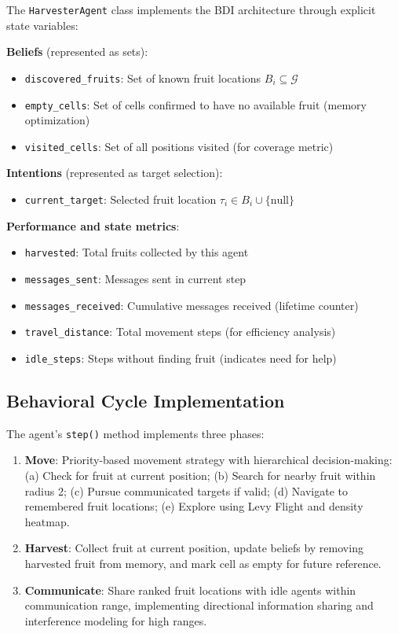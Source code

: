The \texttt{HarvesterAgent} class implements the BDI architecture \citep{bratman1987intention, rao1995bdi} through explicit state variables:

\textbf{Beliefs} (represented as sets):
\begin{itemize}
    \item \texttt{discovered\_fruits}: Set of known fruit locations $B_i \subseteq \mathcal{G}$
    \item \texttt{empty\_cells}: Set of cells confirmed to have no available fruit (memory optimization)
    \item \texttt{visited\_cells}: Set of all positions visited (for coverage metric)
\end{itemize}

\textbf{Intentions} (represented as target selection):
\begin{itemize}
    \item \texttt{current\_target}: Selected fruit location $\tau_i \in B_i \cup \{\text{null}\}$
\end{itemize}

\textbf{Performance and state metrics}:
\begin{itemize}
    \item \texttt{harvested}: Total fruits collected by this agent
    \item \texttt{messages\_sent}: Messages sent in current step
    \item \texttt{messages\_received}: Cumulative messages received (lifetime counter)
    \item \texttt{travel\_distance}: Total movement steps (for efficiency analysis)
    \item \texttt{idle\_steps}: Steps without finding fruit (indicates need for help)
\end{itemize}

\subsection{Behavioral Cycle Implementation}

The agent's \texttt{step()} method implements three phases:

\begin{enumerate}
    \item \textbf{Move}: Priority-based movement strategy with hierarchical decision-making: (a) Check for fruit at current position; (b) Search for nearby fruit within radius 2; (c) Pursue communicated targets if valid; (d) Navigate to remembered fruit locations; (e) Explore using Levy Flight and density heatmap.

    \item \textbf{Harvest}: Collect fruit at current position, update beliefs by removing harvested fruit from memory, and mark cell as empty for future reference.

    \item \textbf{Communicate}: Share ranked fruit locations with idle agents within communication range, implementing directional information sharing and interference modeling for high ranges.
\end{enumerate}

